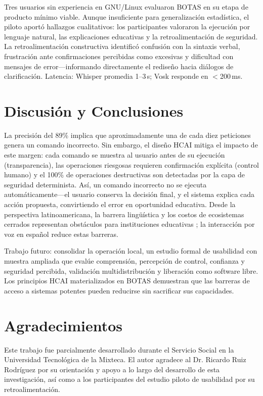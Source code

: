 \documentclass[12pt]{article}
\begin{document}
\noindent
Tres usuarios sin experiencia en GNU/Linux evaluaron BOTAS en su etapa de producto
mínimo viable. Aunque insuficiente para generalización estadística, el piloto
aportó hallazgos cualitativos: los participantes valoraron la ejecución por
lenguaje natural, las explicaciones educativas y la retroalimentación de seguridad.
La retroalimentación constructiva identificó confusión con la sintaxis verbal,
frustración ante confirmaciones percibidas como excesivas y dificultad con
mensajes de error---informando directamente el rediseño hacia diálogos de
clarificación. Latencia: Whisper promedia 1--3\,s; Vosk responde en $<$200\,ms.


\section{Discusión y Conclusiones}
\label{sec:discussion}

\noindent
La precisión del 89\% implica que aproximadamente una de cada diez peticiones
genera un comando incorrecto. Sin embargo, el diseño HCAI mitiga el impacto
de este margen: cada comando se muestra al usuario antes de su ejecución
(transparencia), las operaciones riesgosas requieren confirmación explícita
(control humano) y el 100\% de operaciones destructivas son detectadas por la
capa de seguridad determinista. Así, un comando incorrecto no se ejecuta
automáticamente---el usuario conserva la decisión final, y el sistema
explica cada acción propuesta, convirtiendo el error en oportunidad educativa.
Desde la perspectiva latinoamericana, la barrera lingüística y los costos de
ecosistemas cerrados representan obstáculos para instituciones educativas
\cite{Warschauer2004}; la interacción por voz en español reduce estas barreras.

Trabajo futuro: consolidar la operación local, un estudio formal de usabilidad
con muestra ampliada que evalúe comprensión, percepción de control, confianza
y seguridad percibida, validación multidistribución y liberación como software
libre. Los principios HCAI materializados en BOTAS demuestran que las barreras
de acceso a sistemas potentes pueden reducirse sin sacrificar sus capacidades.


\section*{Agradecimientos}
\noindent
Este trabajo fue parcialmente desarrollado durante el Servicio Social en la
Universidad Tecnológica de la Mixteca. El autor agradece al Dr. Ricardo Ruiz
Rodríguez por su orientación y apoyo a lo largo del desarrollo de esta
investigación, así como a los participantes del estudio piloto de usabilidad
por su retroalimentación.



\end{document}

